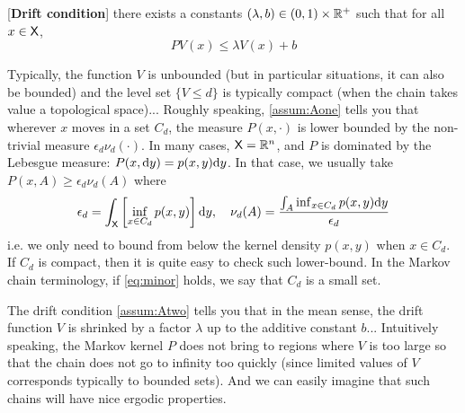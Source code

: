 \documentclass[english,graybox,envcountchap,envcountsame,sectrefs,shortlabels]{svmono}
\theoremstyle{style}
\newenvironment{hyp}[1]{
\begin{enumerate}[label=(\textbf{\sf #1}\arabic*),resume=hyp#1]\begin{sf}}
{\end{sf}\end{enumerate}}
\begin{document}
\begin{shaded}
\begin{hyp}{A}
\item\label{assum:Atwo} [{\bf Drift condition}] there exists a constants $(\lambda,b)\in (0,1) \times \mathbb{R}^+$ such that for all $x\in\mathsf{X}$,
$$
PV(x) \leq \lambda V(x)+b
$$
\end{hyp}

\end{shaded}

Typically, the function $V$ is unbounded (but in particular situations, it can also be bounded) and the level set $\{V\leq d\}$ is typically compact (when the chain takes value a topological space)... Roughly speaking, \ref{assum:Aone} tells you that wherever $x$ moves in a set $C_d$, the measure $P(x,\cdot)$ is lower bounded by the non-trivial measure $\epsilon_d \nu_d(\cdot)$. In many cases, $\mathsf{X}=\mathbb{R}^n$, and $P$ is dominated by the Lebesgue measure: $P(x,\mathrm{d} y)=p(x,y)\mathrm{d} y$. In that case, we usually take $P(x,A)\geq \epsilon_d  \nu_d(A)$ where
$$
 \epsilon_d=\int_{\mathsf{X}} \left[\inf_{x\in C_d}p(x,y)\right]\mathrm{d} y, \quad \nu_d(A)=\frac{\int_A \inf_{x\in C_d}p(x,y)\mathrm{d} y}{\epsilon_d}
$$
i.e. we only need to bound from below the kernel density $p(x,y)$ when $x\in C_d$. If $C_d$ is compact, then it is quite easy to check such lower-bound. In the Markov chain terminology, if   \eqref{eq:minor} holds, we say that $C_d$ is a small set. 

The drift condition \ref{assum:Atwo} tells you that in the mean sense, the drift function $V$ is shrinked by a factor $\lambda$ up to the additive constant $b$... Intuitively speaking, the Markov kernel $P$ does not bring to regions where $V$ is too large so that the chain does not go to infinity too quickly (since limited values of $V$ corresponds typically to bounded sets). And we can easily  imagine that such chains will have nice ergodic properties.
\end{document}
